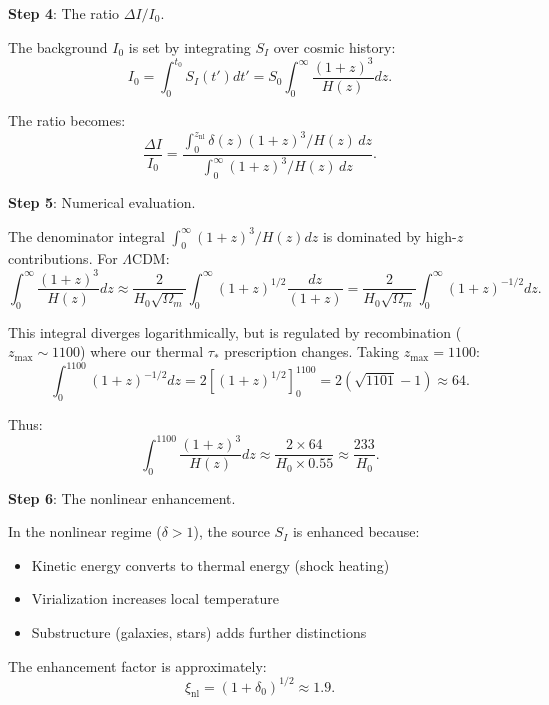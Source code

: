 \documentclass[12pt, a4paper]{article}
\begin{document}
\textbf{Step 4}: The ratio $\Delta I / I_0$.

The background $I_0$ is set by integrating $S_I$ over cosmic history:
\begin{equation}
    I_0 = \int_0^{t_0} S_I(t') dt' = S_0 \int_0^\infty \frac{(1+z)^3}{H(z)} dz.
\end{equation}

The ratio becomes:
\begin{equation}
    \frac{\Delta I}{I_0} = \frac{\int_0^{z_{\text{nl}}} \delta(z) (1+z)^3 / H(z) \, dz}{\int_0^\infty (1+z)^3 / H(z) \, dz}.
\end{equation}

\textbf{Step 5}: Numerical evaluation.

The denominator integral $\int_0^\infty (1+z)^3/H(z) dz$ is dominated by high-$z$ contributions. For $\Lambda$CDM:
\begin{equation}
    \int_0^\infty \frac{(1+z)^3}{H(z)} dz \approx \frac{2}{H_0 \sqrt{\Omega_m}} \int_0^\infty (1+z)^{1/2} \frac{dz}{(1+z)} = \frac{2}{H_0 \sqrt{\Omega_m}} \int_0^\infty (1+z)^{-1/2} dz.
\end{equation}

This integral diverges logarithmically, but is regulated by recombination ($z_{\max} \sim 1100$) where our thermal $\tau_*$ prescription changes. Taking $z_{\max} = 1100$:
\begin{equation}
    \int_0^{1100} (1+z)^{-1/2} dz = 2\left[(1+z)^{1/2}\right]_0^{1100} = 2(\sqrt{1101} - 1) \approx 64.
\end{equation}

Thus:
\begin{equation}
    \int_0^{1100} \frac{(1+z)^3}{H(z)} dz \approx \frac{2 \times 64}{H_0 \times 0.55} \approx \frac{233}{H_0}.
\end{equation}

\textbf{Step 6}: The nonlinear enhancement.

In the nonlinear regime ($\delta > 1$), the source $S_I$ is enhanced because:
\begin{itemize}
    \item Kinetic energy converts to thermal energy (shock heating)
    \item Virialization increases local temperature
    \item Substructure (galaxies, stars) adds further distinctions
\end{itemize}

The enhancement factor is approximately:
\begin{equation}
    \xi_{\text{nl}} = (1 + \delta_0)^{1/2} \approx 1.9.
\end{equation}
\end{document}

